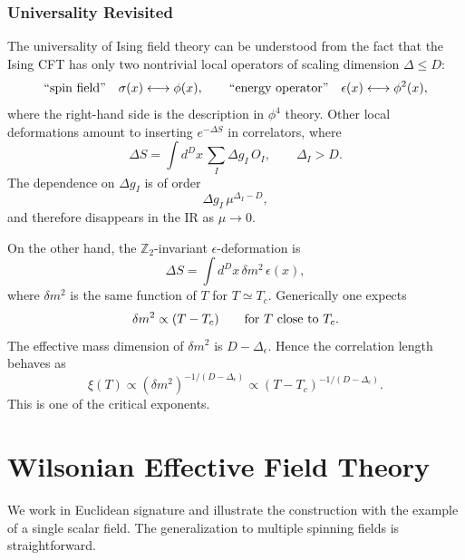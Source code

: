\subsubsection{Universality Revisited}

The universality of Ising field theory can be understood from the fact that
the Ising CFT has only two nontrivial local operators of scaling dimension
\(\Delta\leq D\):
\[
  \hbox{``spin field''}\quad \sigma(x)\longleftrightarrow \phi(x),
  \qquad
  \hbox{``energy operator''}\quad \epsilon(x)\longleftrightarrow \phi^2(x),
\]
where the right-hand side is the description in \(\phi^4\) theory.  Other
local deformations amount to inserting \(e^{-\Delta S}\) in correlators,
where
\[
  \Delta S
  =
  \int d^Dx\,\sum_I \Delta g_I\,O_I,
  \qquad
  \Delta_I>D.
\]
The dependence on \(\Delta g_I\) is of order
\[
  \Delta g_I\,\mu^{\Delta_I-D},
\]
and therefore disappears in the IR as \(\mu\to0\).

On the other hand, the \(\mathbb Z_2\)-invariant \(\epsilon\)-deformation is
\[
  \Delta S=\int d^Dx\,\delta m^2\,\epsilon(x),
\]
where \(\delta m^2\) is the same function of \(T\) for \(T\simeq T_c\).
Generically one expects
\[
  \delta m^2\propto (T-T_c)
  \qquad\hbox{for }T\hbox{ close to }T_c .
\]
The effective mass dimension of \(\delta m^2\) is \(D-\Delta_\epsilon\).
Hence the correlation length behaves as
\[
  \xi(T)\propto(\delta m^2)^{-1/(D-\Delta_\epsilon)}
  \propto
  (T-T_c)^{-1/(D-\Delta_\epsilon)} .
\]
This is one of the critical exponents.

\section{Wilsonian Effective Field Theory}

We work in Euclidean signature and illustrate the construction with the
example of a single scalar field.  The generalization to multiple spinning
fields is straightforward.

